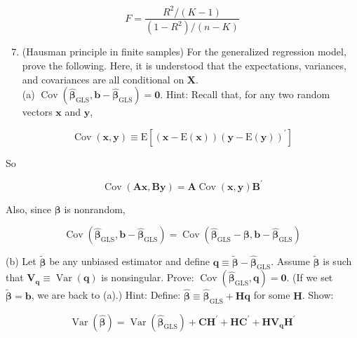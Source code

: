 \documentclass[10pt]{article}
\begin{document}
$$
F=\frac{R^{2} /(K-1)}{\left(1-R^{2}\right) /(n-K)}
$$

\begin{enumerate}
  \setcounter{enumi}{6}
  \item (Hausman principle in finite samples) For the generalized regression model, prove the following. Here, it is understood that the expectations, variances, and covariances are all conditional on $\mathbf{X}$.\\
(a) $\operatorname{Cov}\left(\widehat{\boldsymbol{\beta}}_{\mathrm{GLS}}, \mathbf{b}-\widehat{\boldsymbol{\beta}}_{\mathrm{GLS}}\right)=\mathbf{0}$. Hint: Recall that, for any two random vectors $\mathbf{x}$ and $\mathbf{y}$,
\end{enumerate}

$$
\operatorname{Cov}(\mathbf{x}, \mathbf{y}) \equiv \mathrm{E}\left[(\mathbf{x}-\mathrm{E}(\mathbf{x}))(\mathbf{y}-\mathrm{E}(\mathbf{y}))^{\prime}\right]
$$

So

$$
\operatorname{Cov}(\mathbf{A x}, \mathbf{B y})=\mathbf{A} \operatorname{Cov}(\mathbf{x}, \mathbf{y}) \mathbf{B}^{\prime}
$$

Also, since $\boldsymbol{\beta}$ is nonrandom,

$$
\operatorname{Cov}\left(\widehat{\boldsymbol{\beta}}_{\mathrm{GLS}}, \mathbf{b}-\widehat{\boldsymbol{\beta}}_{\mathrm{GLS}}\right)=\operatorname{Cov}\left(\widehat{\boldsymbol{\beta}}_{\mathrm{GLS}}-\boldsymbol{\beta}, \mathbf{b}-\widehat{\boldsymbol{\beta}}_{\mathrm{GLS}}\right)
$$

(b) Let $\widetilde{\boldsymbol{\beta}}$ be any unbiased estimator and define $\mathbf{q} \equiv \widetilde{\boldsymbol{\beta}}-\widehat{\boldsymbol{\beta}}_{\mathrm{GLS}}$. Assume $\widetilde{\boldsymbol{\beta}}$ is such that $\mathbf{V}_{\mathbf{q}} \equiv \operatorname{Var}(\mathbf{q})$ is nonsingular. Prove: $\operatorname{Cov}\left(\widehat{\boldsymbol{\beta}}_{\mathrm{GLS}}, \mathbf{q}\right)=\mathbf{0}$. (If we set $\widetilde{\boldsymbol{\beta}}=\mathbf{b}$, we are back to (a).) Hint: Define: $\widehat{\boldsymbol{\beta}} \equiv \widehat{\boldsymbol{\beta}}_{\mathrm{GLS}}+\mathbf{H q}$ for some $\mathbf{H}$. Show:

$$
\operatorname{Var}(\widehat{\boldsymbol{\beta}})=\operatorname{Var}\left(\widehat{\boldsymbol{\beta}}_{\mathrm{GLS}}\right)+\mathbf{C H}^{\prime}+\mathbf{H C}^{\prime}+\mathbf{H V}_{\mathbf{q}} \mathbf{H}^{\prime}
$$
\end{document}
